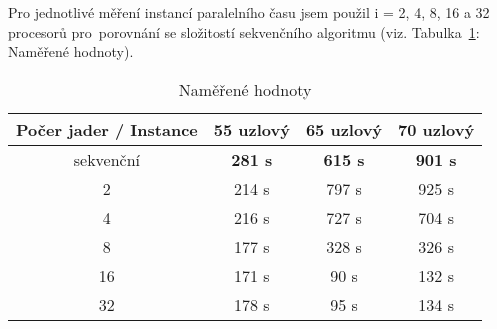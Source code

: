 \documentclass[11pt]{article}
\begin{document}
Pro jednotlivé měření instancí paralelního času jsem použil i = 2, 4, 8, 16 a 32 procesorů pro~porovnání se složitostí sekvenčního algoritmu (viz. Tabulka~\ref{tab:namereneHodnoty}: Naměřené hodnoty).

\begin{table}[h]
	\caption{Naměřené hodnoty}
	\label{tab:namereneHodnoty}
	\centering
	\begin{tabular}{| c || c | c | c |}
		\hline
		\textbf{Počer jader / Instance} & \textbf{55 uzlový} & \textbf{65 uzlový} & \textbf{70 uzlový} \\
		\hline \hline
		sekvenční & \textbf{281 s} & \textbf{615 s} & \textbf{901 s}  \\
		\hline
		2 & 214 s & 797 s & 925 s \\
		\hline
		4 & 216 s & 727 s & 704 s  \\
		\hline
		8 & 177 s & 328 s & 326 s \\
		\hline
		16 & 171 s & 90 s & 132 s  \\
		\hline
		32 & 178 s & 95 s & 134 s  \\
		\hline
	\end{tabular}
\end{table}






\end{document}
